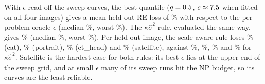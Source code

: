With $\epsilon$ read off the sweep curves, the best quantile ($q=0.5$, $c\approx7.5$
when fitted on all four images) gives a mean held-out RE loss of \nLoioBestMean\% with respect
to the per-problem oracle $\epsilon$ (median \nLoioBestMedian\%, worst \nLoioBestMax\%). The
$\kappa\hat\sigma^2$ rule, evaluated the same way, gives \nLoioSigMean\% (median
\nLoioSigMedian\%, worst \nLoioSigMax\%). Per held-out image, the scale-aware rule loses
\nLoioBestCat\% (cat), \nLoioBestPortrait\% (portrait), \nLoioBestCthead\% (ct\_head) and
\nLoioBestSatellite\% (satellite), against \nLoioSigCat\%, \nLoioSigPortrait\%,
\nLoioSigCthead\% and \nLoioSigSatellite\% for $\kappa\hat\sigma^2$. Satellite is the hardest
case for both rules: its best $\epsilon$ lies at the upper end of the sweep grid, and at small
$\epsilon$ many of its sweep runs hit the NP budget, so its curves are the least reliable.

